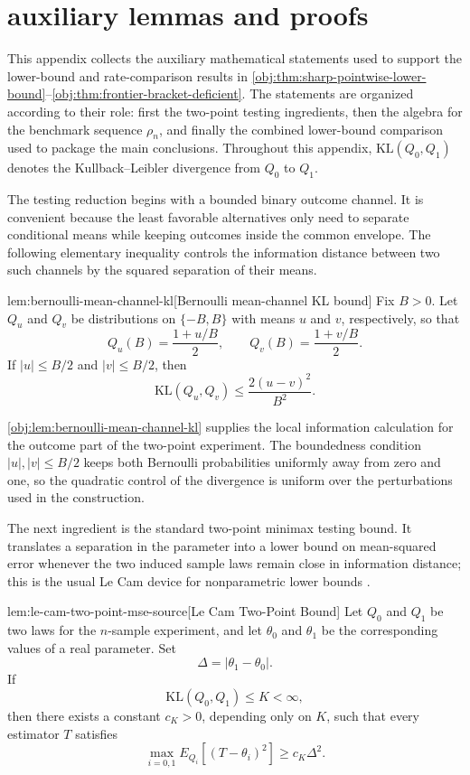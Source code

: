 \section{auxiliary lemmas and proofs}

This appendix collects the auxiliary mathematical statements used to support the lower-bound and rate-comparison results in \cref{obj:thm:sharp-pointwise-lower-bound}--\cref{obj:thm:frontier-bracket-deficient}. The statements are organized according to their role: first the two-point testing ingredients, then the algebra for the benchmark sequence \(\rho_n\), and finally the combined lower-bound comparison used to package the main conclusions. Throughout this appendix, \(\mathrm{KL}(Q_0,Q_1)\) denotes the Kullback--Leibler divergence from \(Q_0\) to \(Q_1\).

The testing reduction begins with a bounded binary outcome channel. It is convenient because the least favorable alternatives only need to separate conditional means while keeping outcomes inside the common envelope. The following elementary inequality controls the information distance between two such channels by the squared separation of their means.

\begin{lemmav}{lem:bernoulli-mean-channel-kl}[Bernoulli mean-channel KL bound]
Fix \(B>0\). Let \(Q_u\) and \(Q_v\) be distributions on \(\{-B,B\}\) with means \(u\) and \(v\), respectively, so that
\[
Q_u(B)=\frac{1+u/B}{2},
\qquad
Q_v(B)=\frac{1+v/B}{2}.
\]
If \(|u|\le B/2\) and \(|v|\le B/2\), then
\[
\mathrm{KL}(Q_u,Q_v)
\le
\frac{2(u-v)^2}{B^2}.
\]
\end{lemmav}

\cref{obj:lem:bernoulli-mean-channel-kl} supplies the local information calculation for the outcome part of the two-point experiment. The boundedness condition \(|u|,|v|\le B/2\) keeps both Bernoulli probabilities uniformly away from zero and one, so the quadratic control of the divergence is uniform over the perturbations used in the construction.

The next ingredient is the standard two-point minimax testing bound. It translates a separation in the parameter into a lower bound on mean-squared error whenever the two induced sample laws remain close in information distance; this is the usual Le Cam device for nonparametric lower bounds \citep{tsybakov2009}.

\begin{lemmav}{lem:le-cam-two-point-mse-source}[Le Cam Two-Point Bound]
Let \(Q_0\) and \(Q_1\) be two laws for the \(n\)-sample experiment, and let \(\theta_0\) and \(\theta_1\) be the corresponding values of a real parameter. Set
\[
\Delta = |\theta_1-\theta_0|.
\]
If
\[
\mathrm{KL}(Q_0,Q_1)\le K<\infty,
\]
then there exists a constant \(c_K>0\), depending only on \(K\), such that every estimator \(T\) satisfies
\[
\max_{i=0,1} E_{Q_i}\!\left[(T-\theta_i)^2\right]\ge c_K \Delta^2 .
\]
\end{lemmav}

